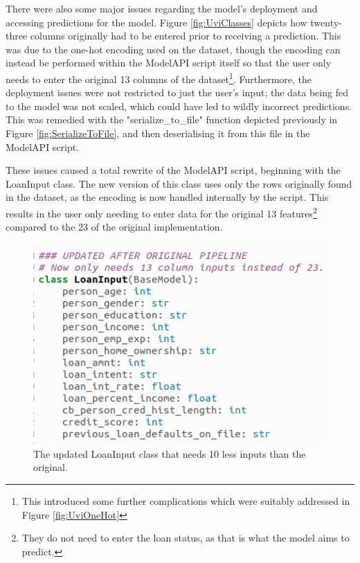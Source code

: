 \documentclass[12pt]{report}
\newcommand{\para}{\vspace{7pt}\noindent}
\begin{document}
There were also some major issues regarding the model's deployment and accessing predictions for the model. Figure \ref{fig:UviClasses} 
depicts how twenty-three columns originally had to be entered prior to receiving a prediction. This was due to the one-hot encoding 
used on the dataset, though the encoding can instead be performed within the ModelAPI script itself so that the user only needs to
enter the original 13 columns of the dataset\footnote{This introduced some further complications which were suitably addressed in Figure \ref{fig:UviOneHot}}. 
Furthermore, the deployment issues were not restricted to just the user's input; the data being fed to the model was not scaled,
which could have led to wildly incorrect predictions. This was remedied with the "serialize\_to\_file" function depicted previously in 
Figure \ref{fig:SerializeToFile}, and then deserialising it from this file in the ModelAPI script.

\para These issues caused a total rewrite of the ModelAPI script, beginning with the LoanInput class. The new version of 
this class uses only the rows originally found in the dataset, as the encoding is now handled internally by the script.
This results in the user only needing to enter data for the original 13 features\footnote{They do not need to enter the loan status, as that is what the model aims to predict.}
compared to the 23 of the original implementation.

\begin{figure}[H]
    \centering
    \includegraphics[width=\linewidth]{Implementation/JAN 10 UPDATES/NewLoanInput.png}
    \caption{The updated LoanInput class that needs 10 less inputs than the original.}
    \label{fig:NewLoanInput}
\end{figure}
\end{document}
